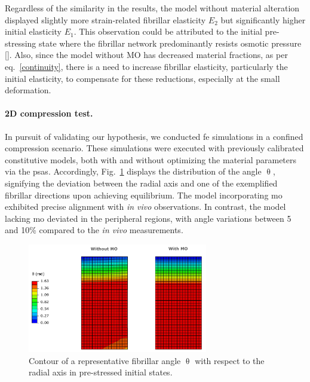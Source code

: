 \documentclass[12pt,a4paper]{report}
\begin{document}
Regardless of the similarity in the results, the model without material alteration displayed slightly more strain-related fibrillar elasticity $E_2$ but significantly higher initial elasticity $E_1$. This observation could be attributed to the initial pre-stressing state where the fibrillar network predominantly resists osmotic pressure [\cite{quiroga2017}]. Also, since the model without MO has decreased material fractions, as per eq.~\ref{continuity}, there is a need to increase fibrillar elasticity, particularly the initial elasticity, to compensate for these reductions, especially at the small deformation.

\paragraph{2D compression test.} In pursuit of validating our hypothesis, we conducted \ac{fe} simulations in a confined compression scenario. These simulations were executed with previously calibrated constitutive models, both with and without optimizing the material parameters via the \acp{psa}. Accordingly, Fig.~\ref{fig:fiber_orientation} displays the distribution of the angle $\uptheta$, signifying the deviation between the radial axis and one of the exemplified fibrillar directions upon achieving equilibrium. The model incorporating \ac{mo} exhibited precise alignment with \textit{in vivo} observations. In contrast, the model lacking \ac{mo} deviated in the peripheral regions, with angle variations between 5 and 10\% compared to the \textit{in vivo} measurements.
%
\begin{figure}\centering
\includegraphics[width=0.7\textwidth]{img/fiber_orientation.jpg}
\caption{Contour of a representative fibrillar angle $\uptheta$  with respect to the radial axis in pre-stressed initial states.}
\label{fig:fiber_orientation}
\end{figure}
\end{document}
